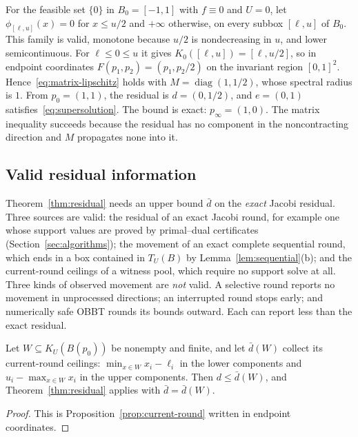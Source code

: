 \begin{example}\label{ex:inactive}
For the feasible set $\{0\}$ in $B_0=[-1,1]$ with $f\equiv0$ and $U=0$,
let $\phi_{[\ell,u]}(x)=0$ for $x\le u/2$ and $+\infty$ otherwise, on
every subbox $[\ell,u]$ of $B_0$. This family is valid, monotone because
$u/2$ is nondecreasing in $u$, and lower semicontinuous. For
$\ell\le0\le u$ it gives $K_0([\ell,u])=[\ell,u/2]$, so in endpoint
coordinates $F(p_1,p_2)=(p_1,p_2/2)$ on the invariant region $[0,1]^2$.
Hence~\eqref{eq:matrix-lipschitz} holds with
$M=\operatorname{diag}(1,1/2)$, whose spectral radius is $1$. From
$p_0=(1,1)$, the residual is $d=(0,1/2)$, and $e=(0,1)$
satisfies~\eqref{eq:supersolution}. The bound is exact: $p_\infty=(1,0)$.
The matrix inequality succeeds because the residual has no component in
the noncontracting direction and $M$ propagates none into it.
\end{example}

\subsection{Valid residual information}\label{sec:residual-valid}

Theorem~\ref{thm:residual} needs an upper bound $\bar d$ on the
\emph{exact} Jacobi residual. Three sources are valid: the residual of an
exact Jacobi round, for example one whose support values are proved by
primal--dual certificates (Section~\ref{sec:algorithms}); the movement of
an exact complete sequential round, which ends in a box contained in
$T_U(B)$ by Lemma~\ref{lem:sequential}(b); and the current-round ceilings
of a witness pool, which require no support solve at all. Three kinds of
observed movement are \emph{not} valid. A selective round reports no
movement in unprocessed directions; an interrupted round stops early; and
numerically safe OBBT rounds its bounds outward. Each can report less
than the exact residual.

\begin{corollary}\label{cor:witness-residual}
Let $W\subseteq K_U(B(p_0))$ be nonempty and finite, and let $\bar d(W)$
collect its current-round ceilings: $\min_{x\in W}x_i-\ell_i$ in the
lower components and $u_i-\max_{x\in W}x_i$ in the upper components.
Then $d\le\bar d(W)$, and Theorem~\ref{thm:residual} applies with
$\bar d=\bar d(W)$.
\end{corollary}
\begin{proof}
This is Proposition~\ref{prop:current-round} written in endpoint
coordinates.
\end{proof}


